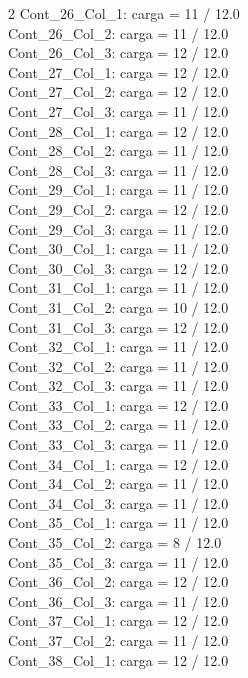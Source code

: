 \begin{multicols}{2}
Cont\_26\_Col\_1: carga = 11 / 12.0\\
Cont\_26\_Col\_2: carga = 11 / 12.0\\
Cont\_26\_Col\_3: carga = 12 / 12.0\\
Cont\_27\_Col\_1: carga = 12 / 12.0\\
Cont\_27\_Col\_2: carga = 12 / 12.0\\
Cont\_27\_Col\_3: carga = 11 / 12.0\\
Cont\_28\_Col\_1: carga = 12 / 12.0\\
Cont\_28\_Col\_2: carga = 11 / 12.0\\
Cont\_28\_Col\_3: carga = 11 / 12.0\\
Cont\_29\_Col\_1: carga = 11 / 12.0\\
Cont\_29\_Col\_2: carga = 12 / 12.0\\
Cont\_29\_Col\_3: carga = 11 / 12.0\\
Cont\_30\_Col\_1: carga = 11 / 12.0\\
Cont\_30\_Col\_3: carga = 12 / 12.0\\
Cont\_31\_Col\_1: carga = 11 / 12.0\\
Cont\_31\_Col\_2: carga = 10 / 12.0\\
Cont\_31\_Col\_3: carga = 12 / 12.0\\
Cont\_32\_Col\_1: carga = 11 / 12.0\\
Cont\_32\_Col\_2: carga = 11 / 12.0\\
Cont\_32\_Col\_3: carga = 11 / 12.0\\
Cont\_33\_Col\_1: carga = 12 / 12.0\\
Cont\_33\_Col\_2: carga = 11 / 12.0\\
Cont\_33\_Col\_3: carga = 11 / 12.0\\
Cont\_34\_Col\_1: carga = 12 / 12.0\\
Cont\_34\_Col\_2: carga = 11 / 12.0\\
Cont\_34\_Col\_3: carga = 11 / 12.0\\
Cont\_35\_Col\_1: carga = 11 / 12.0\\
Cont\_35\_Col\_2: carga = 8 / 12.0\\
Cont\_35\_Col\_3: carga = 11 / 12.0\\
Cont\_36\_Col\_2: carga = 12 / 12.0\\
Cont\_36\_Col\_3: carga = 11 / 12.0\\
Cont\_37\_Col\_1: carga = 12 / 12.0\\
Cont\_37\_Col\_2: carga = 11 / 12.0\\
Cont\_38\_Col\_1: carga = 12 / 12.0\\

\end{multicols}
